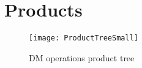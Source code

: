 \section{Products}\label{sec:products}


\begin{figure}
\begin{centering}
\texttt{[image: ProductTreeSmall]}
\caption{DM operations product tree \label{fig:producttree}}
\end{centering}
\end{figure}


